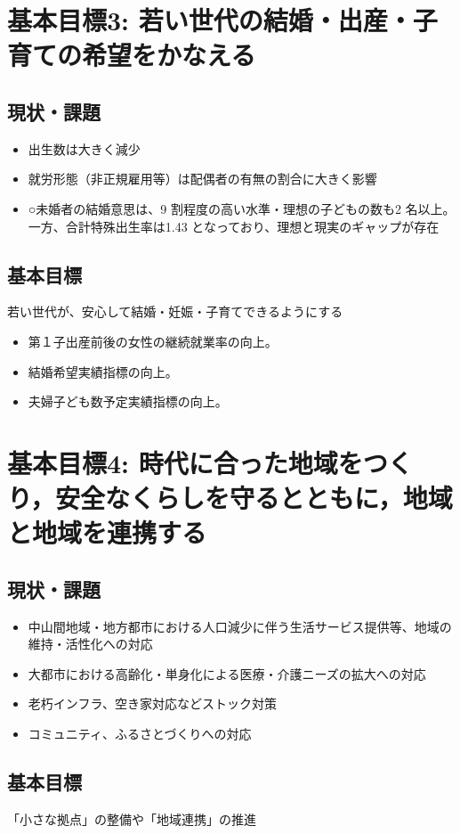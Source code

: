 \section {基本目標3: 若い世代の結婚・出産・子育ての希望をかなえる}
\subsection {現状・課題}
\begin {itemize}
\item 出生数は大きく減少　
\item 就労形態（非正規雇用等）は配偶者の有無の割合に大きく影響
\item ○未婚者の結婚意思は、9 割程度の高い水準・理想の子どもの数も2 名以上。一方、合計特殊出生率は1.43 となっており、理想と現実のギャップが存在
\end {itemize}

\begin{figure}[htb]
  \begin{center}
  \end{center}
\end{figure}


\subsection {基本目標}
若い世代が、安心して結婚・妊娠・子育てできるようにする
\begin {itemize}
\item 第１子出産前後の女性の継続就業率の向上。
\item 結婚希望実績指標の向上。
\item 夫婦子ども数予定実績指標の向上。
\end {itemize}

\section {基本目標4: 時代に合った地域をつくり，安全なくらしを守るとともに，地域と地域を連携する}
\subsection {現状・課題}
\begin {itemize}
\item 中山間地域・地方都市における人口減少に伴う生活サービス提供等、地域の維持・活性化への対応
\item 大都市における高齢化・単身化による医療・介護ニーズの拡大への対応
\item 老朽インフラ、空き家対応などストック対策
\item コミュニティ、ふるさとづくりへの対応
\end {itemize}

\subsection {基本目標}
            「小さな拠点」の整備や「地域連携」の推進

            

